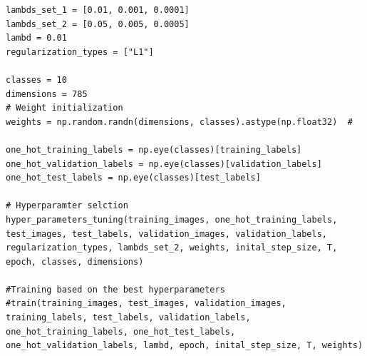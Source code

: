 \documentclass{article} %
\begin{document}
\begin{lstlisting}
lambds_set_1 = [0.01, 0.001, 0.0001]
lambds_set_2 = [0.05, 0.005, 0.0005]
lambd = 0.01
regularization_types = ["L1"]

classes = 10
dimensions = 785
# Weight initialization
weights = np.random.randn(dimensions, classes).astype(np.float32)  #

one_hot_training_labels = np.eye(classes)[training_labels] 
one_hot_validation_labels = np.eye(classes)[validation_labels]
one_hot_test_labels = np.eye(classes)[test_labels]  

# Hyperparamter selction
hyper_parameters_tuning(training_images, one_hot_training_labels, test_images, test_labels, validation_images, validation_labels, regularization_types, lambds_set_2, weights, inital_step_size, T, epoch, classes, dimensions)

#Training based on the best hyperparameters
#train(training_images, test_images, validation_images, training_labels, test_labels, validation_labels, one_hot_training_labels, one_hot_test_labels, one_hot_validation_labels, lambd, epoch, inital_step_size, T, weights)


\end{lstlisting}
\end{document}
